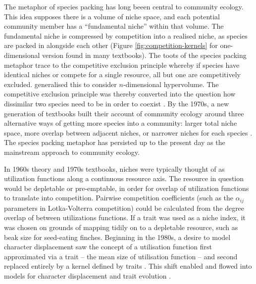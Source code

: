 \documentclass[a4paper,11pt]{article}
\begin{document}
The metaphor of species packing has long beeen central to community
ecology.  This idea supposes there is a volume of niche space, and
each potential community member has a ``fundamental niche'' within
that volume.  The fundamental niche is compressed by competition into
a realised niche, as species are packed in alongside each other
(Figure \ref{fig:competition-kernels} for one-dimensional version
found in many textbooks).
%
The toots of the species packing metaphor trace to the competitive
exclusion principle \citep{Lotka-1925, Volterra-1926, Gause-1934}
whereby if species have identical niches or compete for a single
resource, all but one are competitively excluded.
\citet{Hutchinson-1957} generalised this to consider $n$-dimensional
hypervolume.
%
The competitive exclusion principle was thereby converted into the
question how dissimilar two species need to be in order to coexist
\citep{MacArthur-1967, Slatkin-1980}.
%
By the 1970s, a new generation of textbooks built their account of
community ecology around three alternative ways of getting more
species into a community: larger total niche space, more overlap
between adjacent niches, or narrower niches for each species
\citep{Whittaker-1970,Krebs-1972,Ricklefs-1973,Pianka-1974}. The
species packing metaphor has persisted up to the present day as the
mainstream approach to community ecology.

In 1960s theory and 1970s textbooks, niches were typically thought of
as utilization functions along a continuous resource axis. The
resource in question would be depletable or pre-emptable, in order for
overlap of utilization functions to translate into
competition. Pairwise competition coefficients (such as the
$\alpha_{ij}$ parameters in Lotka-Volterra competition) could be
calculated from the degree overlap of between utilizations functions.
If a trait was used as a niche index, it was chosen on grounds of
mapping tidily on to a depletable resource, such as beak size for
seed-eating finches. Beginning in the 1980s, a desire to model
character displacement saw the concept of a utilisation function first
approximated via a trait -- the mean size of utilisation function
\citep {Roughgarden-1979} -- and second replaced entirely by a kernel
defined by traits \citep{Slatkin-1980,Taper-1985}. This shift enabled
and flowed into models for character displacement
\citep[e.g.,][]{Taper-1985, Case-2000, Goldberg-2006} and trait
evolution \citep{Brown-1987,Geritz-1998,Geritz-1999,Dieckmann-1999,
  Abrams-2001}.
\end{document}
